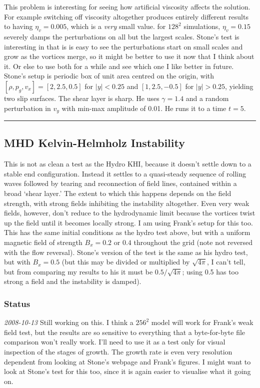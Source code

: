 \documentclass[11pt]{article}
\begin{document}
This problem is interesting for seeing how artificial viscosity
affects the solution.  For example switching off viscosity altogether
produces entirely different results to having $\eta_v=0.005$, which is
a \emph{very} small value.  for $128^2$ simulations, $\eta_v=0.15$
severely damps the perturbations on all but the largest scales.
Stone's test is interesting in that is is easy to see the
perturbations start on small scales and grow as the vortices merge, so
it might be better to use it now that I think about it.  Or else to
use both for a while and see which one I like better in future.
Stone's setup is periodic box of unit area centred on the origin, with
$[\rho,p_g,v_x]=[2,2.5,0.5]$ for $|y|<0.25$ and $[1,2.5,-0.5]$ for
$|y|>0.25$, yielding two slip surfaces.  The shear layer is sharp.  He
uses $\gamma=1.4$ and a random perturbation in $v_y$ with min-max
amplitude of 0.01.  He runs it to a time $t=5$.


\vspace{0.4cm} \hrule
\subsection{MHD Kelvin-Helmholz Instability}
This is not as clean a test as the Hydro KHI, because it doesn't
settle down to a stable end configuration.  Instead it settles to a
quasi-steady sequence of rolling waves followed by tearing and
reconnection of field lines, contained within a broad `shear layer.'
The extent to which this happens depends on the field strength, with
strong fields inhibiting the instability altogether.  Even very weak
fields, however, don't reduce to the hydrodynamic limit because the
vortices twist up the field until it becomes locally strong.  I am
using Frank's setup for this too.  This has the same initial
conditions as the hydro test above, but with a uniform magnetic field
of strength $B_x=0.2$ or $0.4$ throughout the grid (note not reversed
with the flow reversal).  Stone's version of the test is the same as
his hydro test, but with $B_x=0.5$ (but this may be divided or
multiplied by $\sqrt{4\pi}$, I can't tell, but from comparing my
results to his it must be $0.5/\sqrt{4\pi}$; using 0.5 has too strong
a field and the instability is damped).
\subsubsection{Status}
\textit{2008-10-13} Still working on this.  I think a $256^2$ model
will work for Frank's weak field test, but the results are so
sensitive to everything that a byte-for-byte file comparison won't
really work.  I'll need to use it as a test only for visual inspection
of the stages of growth.  The growth rate is even very resolution
dependent from looking at Stone's webpage and Frank's figures.  I
might want to look at Stone's test for this too, since it is again
easier to visualise what it going on.
\end{document}
